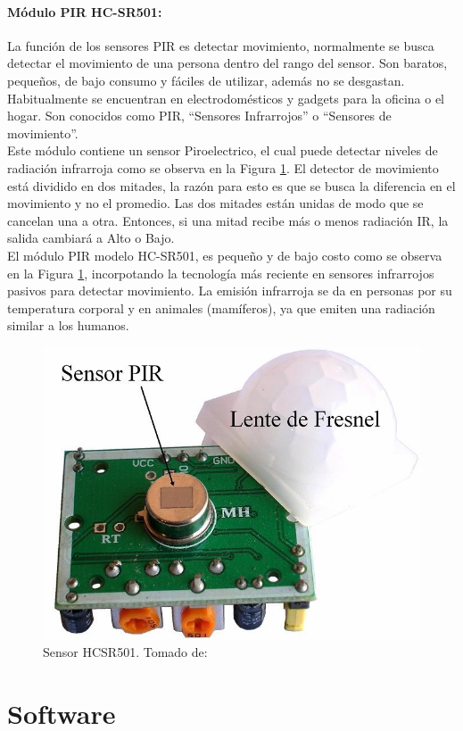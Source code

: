 \paragraph{Módulo PIR HC-SR501: }

La función de los sensores PIR es detectar movimiento, normalmente se busca detectar el movimiento de una persona dentro del rango del sensor. Son baratos, pequeños, de bajo consumo y fáciles de utilizar, además no se desgastan. Habitualmente se encuentran en electrodomésticos y gadgets para la oficina o el hogar. Son conocidos como PIR, ``Sensores Infrarrojos'' o ``Sensores de movimiento''.\\

Este módulo contiene un sensor Piroelectrico, el cual puede detectar niveles de radiación infrarroja como se observa en la Figura \ref{fig:sensor-hc-sr501-1000-m}. El detector de movimiento está dividido en dos mitades, la razón para esto es que se busca la diferencia en el movimiento y no el promedio. Las dos mitades están unidas de modo que se cancelan una a otra. Entonces, si una mitad recibe más o menos radiación IR, la salida cambiará a Alto o Bajo. \cite{PIR1}\\

El módulo PIR modelo HC-SR501, es pequeño y de bajo costo como se observa en la Figura \ref{fig:sensor-hc-sr501-1000-m}, incorpotando la tecnología más reciente en sensores infrarrojos pasivos para detectar movimiento. La emisión infrarroja se da en personas por su temperatura corporal y en animales (mamíferos), ya que emiten una radiación similar a los humanos. \cite{PIR2}

\begin{figure}[H]
	\centering
	\caption{Sensor HCSR501. Tomado de: \cite{PIR2}}
	\label{fig:sensor-hc-sr501-1000-m}
	\includegraphics[width=0.5\linewidth]{Imagenes/SENSOR-HC-SR501-1000-M}
\end{figure}

\section{Software}

